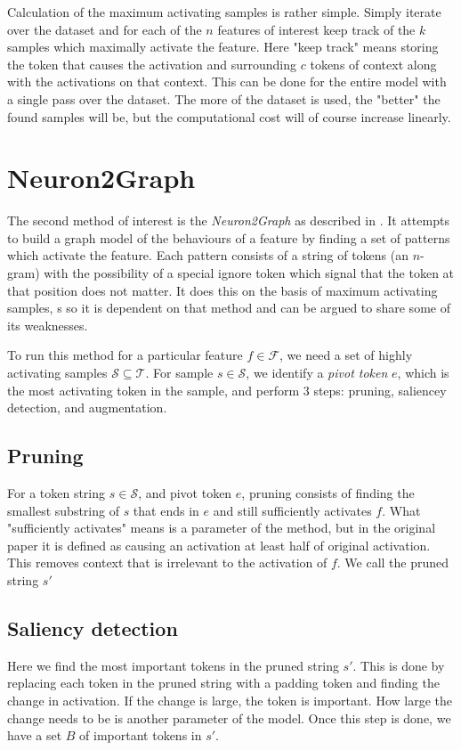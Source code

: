 \documentclass[../main.tex]{subfiles}
\begin{document}
Calculation of the maximum activating samples is rather simple.
Simply iterate over the dataset 
and for each of the $n$ features of interest 
keep track of the $k$ samples which maximally activate the feature.
Here "keep track" means storing the token that causes the activation and 
surrounding $c$ tokens of context along with the activations on that context.
This can be done for the entire model with a single pass over the dataset.
The more of the dataset is used, the "better" the found samples will be, 
but the computational cost will of course increase linearly.

\section{Neuron2Graph}
The second method of interest is the \emph{Neuron2Graph} 
as described in \citet{foote_neuron_2023}.
It attempts to build a graph model of the behaviours of a feature 
by finding a set of patterns which activate the feature.
Each pattern consists of a string of tokens (an $n$-gram) 
with the possibility of a special ignore token 
which signal that the token at that position does not matter.
It does this on the basis of maximum activating samples,
s 
so it is dependent on that method and 
can be argued to share some of its weaknesses.

To run this method for a particular feature $f\in\mathcal{F}$, 
we need a set of highly activating samples $\mathcal S\subseteq \mathcal T$.
For sample $s\in\mathcal S$, we identify a \emph{pivot token} $e$, 
which is the most activating token in the sample, 
and perform 3 steps: pruning, saliencey detection, and augmentation.

\subsection{Pruning}
For a token string $s\in\mathcal S$, and pivot token $e$, 
pruning consists of finding the smallest substring of $s$ that ends in $e$ 
and still sufficiently activates $f$.
What "sufficiently activates" means is a parameter of the method, 
but in the original paper it is defined as causing an activation at least
half of original activation.
This removes context that is irrelevant to the activation of $f$.
We call the pruned string $s'$

\subsection{Saliency detection}
Here we find the most important tokens in the pruned string $s'$.
This is done by replacing each token in the pruned string 
with a padding token and finding the change in activation.
If the change is large, the token is important.
How large the change needs to be is another parameter of the model.
Once this step is done, we have a set $B$ of important tokens in $s'$.
\end{document}
